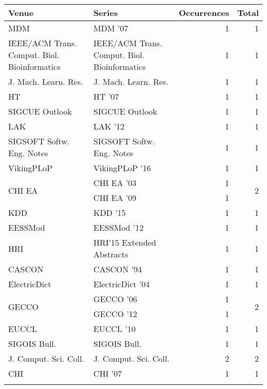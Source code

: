 \begin{table*}[t]
\begin{tabular}{llrr}
Venue & Series & Occurrences & Total\\\hline
\multirow{1}{*}{MDM } & MDM '07 & 1 & \multirow{1}{*}{1}\\
\multirow{1}{*}{IEEE/ACM Trans. Comput. Biol. Bioinformatics} & IEEE/ACM Trans. Comput. Biol. Bioinformatics & 1 & \multirow{1}{*}{1}\\
\multirow{1}{*}{J. Mach. Learn. Res.} & J. Mach. Learn. Res. & 1 & \multirow{1}{*}{1}\\
\multirow{1}{*}{HT } & HT '07 & 1 & \multirow{1}{*}{1}\\
\multirow{1}{*}{SIGCUE Outlook} & SIGCUE Outlook & 1 & \multirow{1}{*}{1}\\
\multirow{1}{*}{LAK } & LAK '12 & 1 & \multirow{1}{*}{1}\\
\multirow{1}{*}{SIGSOFT Softw. Eng. Notes} & SIGSOFT Softw. Eng. Notes & 1 & \multirow{1}{*}{1}\\
\multirow{1}{*}{VikingPLoP } & VikingPLoP '16 & 1 & \multirow{1}{*}{1}\\
\multirow{2}{*}{CHI EA } & CHI EA '03 & 1 & \multirow{2}{*}{2}\\
& CHI EA '09 & 1 &\\
\multirow{1}{*}{KDD } & KDD '15 & 1 & \multirow{1}{*}{1}\\
\multirow{1}{*}{EESSMod } & EESSMod '12 & 1 & \multirow{1}{*}{1}\\
\multirow{1}{*}{HRI} & HRI'15 Extended Abstracts & 1 & \multirow{1}{*}{1}\\
\multirow{1}{*}{CASCON } & CASCON '94 & 1 & \multirow{1}{*}{1}\\
\multirow{1}{*}{ElectricDict } & ElectricDict '04 & 1 & \multirow{1}{*}{1}\\
\multirow{2}{*}{GECCO } & GECCO '06 & 1 & \multirow{2}{*}{2}\\
& GECCO '12 & 1 &\\
\multirow{1}{*}{EUCCL } & EUCCL '10 & 1 & \multirow{1}{*}{1}\\
\multirow{1}{*}{SIGOIS Bull.} & SIGOIS Bull. & 1 & \multirow{1}{*}{1}\\
\multirow{1}{*}{J. Comput. Sci. Coll.} & J. Comput. Sci. Coll. & 2 & \multirow{1}{*}{2}\\
\multirow{1}{*}{CHI } & CHI '07 & 1 & \multirow{1}{*}{1}\\
\label{ALL-associative learning}
\end{tabular}
\end{table*}